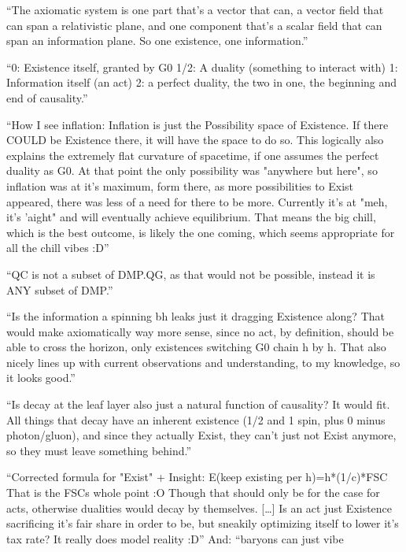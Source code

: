 \documentclass[11pt,a4paper]{article}
\theoremstyle{definition}
\begin{document}
\begin{description}[style=unboxed,leftmargin=0pt,font=\normalfont\bfseries]
\item[15:25Z.] ``The axiomatic system is one part that's a vector that can, a vector field that can span a relativistic plane, and one
component that's a scalar field that can span an information plane. So one existence, one information.''
\item[16:21Z.] ``0: Existence itself, granted by G0 1/2: A duality (something to interact with) 1: Information itself (an act) 2: a perfect
duality, the two in one, the beginning and end of causality.''
\item[17:14Z.] ``How I see inflation: Inflation is just the Possibility space of Existence. If there COULD be Existence there, it will have
the space to do so. This logically also explains the extremely flat curvature of spacetime, if one assumes the perfect duality as G0. At
that point the only possibility was "anywhere but here", so inflation was at it's maximum, form there, as more possibilities to Exist
appeared, there was less of a need for there to be more. Currently it's at "meh, it's 'aight" and will eventually achieve equilibrium. That
means the big chill, which is the best outcome, is likely the one coming, which seems appropriate for all the chill vibes :D''
\item[17:57Z.] ``QC is not a subset of DMP.QG, as that would not be possible, instead it is ANY subset of DMP.''
\item[18:57Z.] ``Is the information a spinning bh leaks just it dragging Existence along? That would make axiomatically way more sense,
since no act, by definition, should be able to cross the horizon, only existences switching G0 chain h by h. That also nicely lines up with
current observations and understanding, to my knowledge, so it looks good.''
\item[19:35Z.] ``Is decay at the leaf layer also just a natural function of causality? It would fit. All things that decay have an inherent
existence (1/2 and 1 spin, plus 0 minus photon/gluon), and since they actually Exist, they can't just not Exist anymore, so they must leave
something behind.''
\item[19:58Z.] ``Corrected formula for "Exist" + Insight: E(keep existing per h)=h*(1/c)*FSC That is the FSCs whole point :O Though that
should only be for the case for acts, otherwise dualities would decay by themselves. [\dots] Is an act just Existence sacrificing it's fair
share in order to be, but sneakily optimizing itself to lower it's tax rate? It really does model reality :D'' And: ``baryons can just vibe

\end{description}
\end{document}
